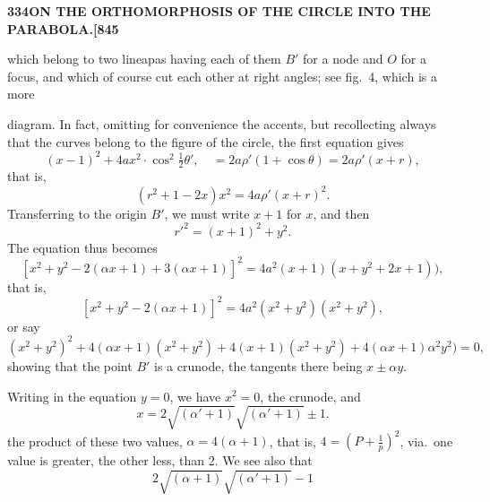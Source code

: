 \documentclass[12pt,a4paper]{article}
\theoremstyle{definition}
\begin{document}
\noindent\textbf{334}\hfill\textbf{ON THE ORTHOMORPHOSIS OF THE CIRCLE INTO THE PARABOLA.}\hfill\textbf{[845}

\bigskip

\noindent which belong to two lineapas having each of them $B'$ for a node and $O$ for a focus, and which of course cut each other at right angles; see fig.\ 4, which is a more

\begin{figure}[H]
\centering
{}
\end{figure}

diagram. In fact, omitting for convenience the accents, but recollecting always that the curves belong to the figure of the circle, the first equation gives
\[
(x - 1)^2 + 4ax^2 \cdot \cos^2\tfrac{1}{2}\theta', \quad = 2a\rho'(1 + \cos\theta) = 2a\rho'(x + r),
\]
that is,
\[
(r^2 + 1 - 2x)x^2 = 4a\rho'(x + r)^2.
\]
Transferring to the origin $B'$, we must write $x + 1$ for $x$, and then
\[
r'^2 = (x + 1)^2 + y^2.
\]
The equation thus becomes
\[
[x^2 + y^2 - 2(\alpha x + 1) + 3(\alpha x + 1)]^2 = 4a^2(x + 1)(x + y^2 + 2x + 1)),
\]
that is,
\[
[x^2 + y^2 - 2(\alpha x + 1)]^2 = 4a^2(x^2 + y^2)(x^2 + y^2),
\]
or say
\[
(x^2 + y^2)^2 + 4(\alpha x + 1)(x^2 + y^2) + 4(x + 1)(x^2 + y^2) + 4(\alpha x + 1)\alpha^2y^2) = 0,
\]
showing that the point $B'$ is a crunode, the tangents there being $x \pm \alpha y$.

Writing in the equation $y = 0$, we have $x^2 = 0$, the crunode, and
\[
x = 2\sqrt{(\alpha' + 1)}\sqrt{(\alpha' + 1)} \pm 1.
\]
the product of these two values, $\alpha = 4(\alpha + 1)$, that is, $4 = \left(P + \frac{1}{p}\right)^2$, via.\ one value is greater, the other less, than 2. We see also that
\[
2\sqrt{(\alpha + 1)}\sqrt{(\alpha' + 1)} - 1
\]
\end{document}

